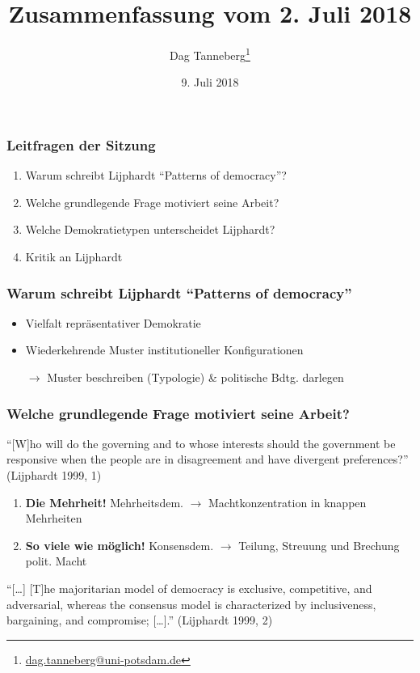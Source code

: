 \documentclass{beamer}
\title{Zusammenfassung vom 2. Juli 2018}
\author{Dag Tanneberg\thanks{%
  \href{mailto:dag.tanneberg@uni-potsdam.de}%
    {dag.tanneberg@uni-potsdam.de}
  }
}
\institute[Universität Potsdam]{
  {\glqq}Grundlagen der Vergleichenden Politikwissenschaft{\grqq}\\
  Universität Potsdam\\
  Lehrstuhl für Vergleichende Politikwissenschaft\\
  Sommersemester 2018
}
\date{9. Juli 2018}
\begin{document}
\maketitle

\begin{frame}
\frametitle{Leitfragen der Sitzung}
\begin{enumerate}
  \item Warum schreibt Lijphardt ``Patterns of democracy''?
  \item Welche grundlegende Frage motiviert seine Arbeit?
  \item Welche Demokratietypen unterscheidet Lijphardt?
  \item Kritik an Lijphardt
\end{enumerate}
\end{frame}

\begin{frame}
\frametitle{Warum schreibt Lijphardt ``Patterns of democracy''}
\begin{itemize}
  \item Vielfalt repräsentativer Demokratie
  \item Wiederkehrende Muster institutioneller Konfigurationen
  \item [$\rightarrow$] Muster beschreiben (Typologie) \&
    politische Bdtg. darlegen
\end{itemize}
\end{frame}

\begin{frame}
\frametitle{Welche grundlegende Frage motiviert seine Arbeit?}
  ``[W]ho will do the governing and to whose
  interests should the government be responsive when the
  people are in disagreement and have divergent
  preferences?''
  (Lijphardt 1999, 1)

\begin{enumerate}
  \item \textbf{Die Mehrheit!} \newline
    Mehrheitsdem. $\rightarrow$ Machtkonzentration in knappen
    Mehrheiten
  \item \textbf{So viele wie möglich!} \newline
    Konsensdem. $\rightarrow$ Teilung, Streuung und Brechung
    polit. Macht
\end{enumerate}

  ``[\dots] [T]he majoritarian model of democracy is exclusive,
  competitive, and adversarial, whereas the consensus model
  is characterized by inclusiveness, bargaining, and
  compromise; [\dots].'' (Lijphardt 1999, 2)
\end{frame}
\end{document}
